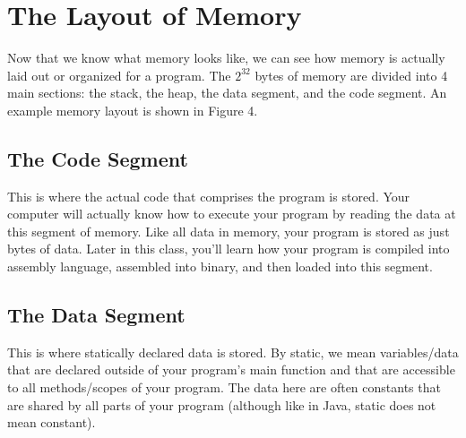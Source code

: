 \documentclass{article}
\begin{document}
\begin{center}
\end{center}
\section{The Layout of Memory}
Now that we know what memory looks like, we can see how memory is actually laid out or organized for a program. The $2^{32}$ bytes of memory are divided into 4 main sections: the stack, the heap, the data segment, and the code segment. An example memory layout is shown in Figure 4.

\subsection{The Code Segment}
This is where the actual code that comprises the program is stored. Your computer will actually know how to execute your program by reading the data at this segment of memory. Like all data in memory, your program is stored as just bytes of data. Later in this class, you'll learn how your program is compiled into assembly language, assembled into binary, and then loaded into this segment.

\subsection{The Data Segment}
This is where statically declared data is stored. By static, we mean variables/data that are declared outside of your program's main function and that are accessible to all methods/scopes of your program. The data here are often constants that are shared by all parts of your program (although like in Java, static does not mean constant). 
\end{document}
